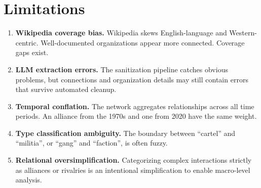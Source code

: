\documentclass[11pt,a4paper]{article}
\begin{document}
\section{Limitations}\label{sec:limitations}

\begin{enumerate}[leftmargin=2em]
  \item \textbf{Wikipedia coverage bias.} Wikipedia skews English-language and Western-centric. Well-documented organizations appear more connected. Coverage gaps exist.
  \item \textbf{LLM extraction errors.} The sanitization pipeline catches obvious problems, but connections and organization details may still contain errors that survive automated cleanup.
  \item \textbf{Temporal conflation.} The network aggregates relationships across all time periods. An alliance from the 1970s and one from 2020 have the same weight.
  \item \textbf{Type classification ambiguity.} The boundary between ``cartel'' and ``militia'', or ``gang'' and ``faction'', is often fuzzy.
  \item \textbf{Relational oversimplification.} Categorizing complex interactions strictly as alliances or rivalries is an intentional simplification to enable macro-level analysis.
\end{enumerate}

% 
% 
\end{document}
